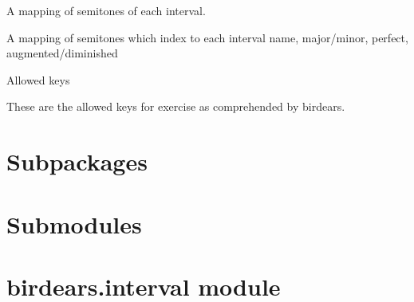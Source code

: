 \documentclass[letterpaper,10pt,english]{sphinxmanual}
\begin{document}

\begin{fulllineitems}
\label{\detokenize{index:birdears.INTERVAL_INDEX}}
 \textendash{} A mapping of semitones of each interval.

A mapping of semitones which index to each interval name, major/minor,
perfect, augmented/diminished

\end{fulllineitems}


\begin{fulllineitems}
\label{\detokenize{index:birdears.KEYS}}
 \textendash{} Allowed keys

These are the allowed keys for exercise as comprehended by birdears.

\end{fulllineitems}



\section{Subpackages}
\label{\detokenize{index:subpackages}}

\section{Submodules}
\label{\detokenize{index:submodules}}

\section{birdears.interval module}
\label{\detokenize{index:module-birdears.interval}}\label{\detokenize{index:birdears-interval-module}}
\end{document}
